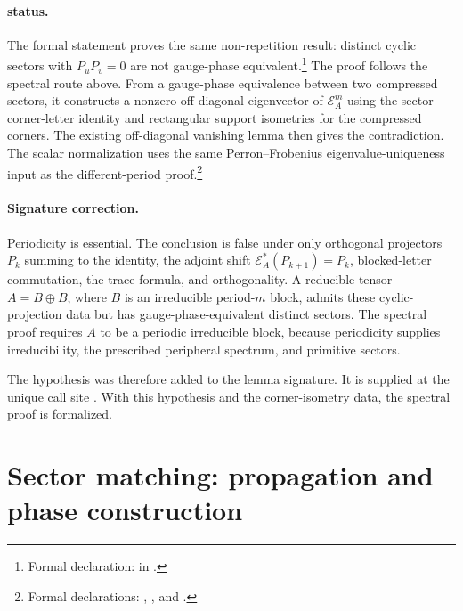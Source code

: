\documentclass{article}
\begin{document}
\paragraph{\Lean{} status.}

The formal statement proves the same non-repetition result: distinct cyclic
sectors with $P_uP_v=0$ are not gauge-phase equivalent.\footnote{Formal
declaration:
 in
.} The proof follows the spectral route above. From a
gauge-phase equivalence between two compressed sectors, it constructs a
nonzero off-diagonal eigenvector of $\mathcal E_A^m$ using the sector
corner-letter identity and rectangular support isometries for the compressed
corners. The existing off-diagonal vanishing lemma then gives the
contradiction. The scalar normalization uses the same Perron--Frobenius
eigenvalue-uniqueness input as the different-period proof.\footnote{Formal
declarations:
,
, and
.}

\paragraph{Signature correction.}

Periodicity is essential. The conclusion is false under only orthogonal
projectors $P_k$ summing to the identity, the adjoint shift
$\mathcal E_A^*(P_{k+1})=P_k$, blocked-letter commutation, the trace formula,
and orthogonality. A reducible tensor $A=B\oplus B$, where $B$ is an
irreducible period-$m$ block, admits these cyclic-projection data but has
gauge-phase-equivalent distinct sectors. The spectral proof requires $A$ to
be a periodic irreducible block, because periodicity supplies irreducibility,
the prescribed peripheral spectrum, and primitive sectors.

The hypothesis  was therefore added to the lemma
signature. It is supplied at the unique call site
. With this hypothesis and the
corner-isometry data, the spectral proof is formalized.

\section{Sector matching: propagation and phase construction}
\end{document}
